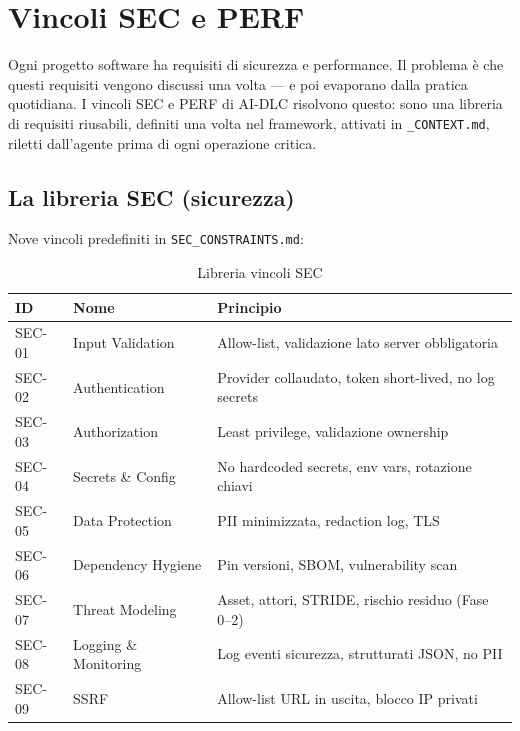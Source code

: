 ﻿%

\chapter{Vincoli SEC e PERF}
\label{ch:vincoli-sec-perf}

Ogni progetto software ha requisiti di sicurezza e performance. Il problema è che questi requisiti vengono discussi una volta --- e poi evaporano dalla pratica quotidiana. I vincoli SEC e PERF di AI-DLC risolvono questo: sono una libreria di requisiti riusabili, definiti una volta nel framework, attivati in \texttt{\_CONTEXT.md}, riletti dall'agente prima di ogni operazione critica.

\section{La libreria SEC (sicurezza)}
\label{sec:11-libreria-sec}

Nove vincoli predefiniti in \texttt{SEC\_CONSTRAINTS.md}:

\begin{table}[htbp]
  \centering
  \begin{tabular}{lll}
    \toprule
    \textbf{ID} & \textbf{Nome} & \textbf{Principio} \\
    \midrule
    SEC-01 & Input Validation & Allow-list, validazione lato server obbligatoria \\
    SEC-02 & Authentication & Provider collaudato, token short-lived, no log secrets \\
    SEC-03 & Authorization & Least privilege, validazione ownership \\
    SEC-04 & Secrets \& Config & No hardcoded secrets, env vars, rotazione chiavi \\
    SEC-05 & Data Protection & PII minimizzata, redaction log, TLS \\
    SEC-06 & Dependency Hygiene & Pin versioni, SBOM, vulnerability scan \\
    SEC-07 & Threat Modeling & Asset, attori, STRIDE, rischio residuo (Fase 0--2) \\
    SEC-08 & Logging \& Monitoring & Log eventi sicurezza, strutturati JSON, no PII \\
    SEC-09 & SSRF & Allow-list URL in uscita, blocco IP privati \\
    \bottomrule
  \end{tabular}
  \caption{Libreria vincoli SEC}
  \label{tab:11-sec}
\end{table}

